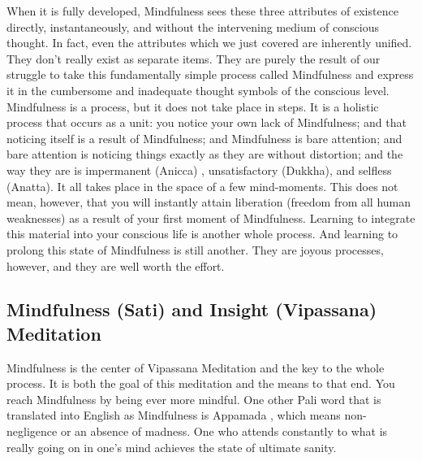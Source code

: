 When it is fully developed, Mindfulness sees these three attributes of existence
directly, instantaneously, and without the intervening medium of conscious
thought. In fact, even the attributes which we just covered are inherently
unified. They don't really exist as separate items. They are purely the result
of our struggle to take this fundamentally simple process called Mindfulness and
express it in the cumbersome and inadequate thought symbols of the conscious
level. Mindfulness is a process, but it does not take place in steps. It is a
holistic process that occurs as a unit: you notice your own lack of Mindfulness;
and that noticing itself is a result of Mindfulness; and Mindfulness is bare
attention; and bare attention is noticing things exactly as they are without
distortion; and the way they are is impermanent (Anicca) , unsatisfactory
(Dukkha), and selfless (Anatta). It all takes place in the space of a few
mind-moments. This does not mean, however, that you will instantly attain
liberation (freedom from all human weaknesses) as a result of your first moment
of Mindfulness. Learning to integrate this material into your conscious life is
another whole process. And learning to prolong this state of Mindfulness is
still another. They are joyous processes, however, and they are well worth the
effort.

\subsection*{Mindfulness (Sati) and Insight (Vipassana) Meditation}
Mindfulness is the center
of Vipassana Meditation and the key to the whole process. It is both the goal of
this meditation and the means to that end. You reach Mindfulness by being ever
more mindful. One other Pali word that is translated into English as Mindfulness
is Appamada , which means non-negligence or an absence of madness. One who
attends constantly to what is really going on in one's mind achieves the state
of ultimate sanity.

